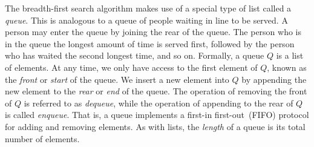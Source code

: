 The breadth-first search algorithm makes
use of a special type of list called a \emph{queue}. This
is analogous to a queue of people waiting in line to be served. A
person may enter the queue by joining the rear of the queue. The
person who is in the queue the longest amount of time is served first,
followed by the person who has waited the second longest time, and so
on. Formally, a queue $Q$ is a list of elements. At any
time, we only have access to the first element of $Q$, known as the
\emph{front} or \emph{start} of
the queue. We insert a new element into $Q$ by appending the new
element to the \emph{rear} or
\emph{end} of the queue. The operation of removing
the front of $Q$ is referred to as \emph{dequeue},
while the operation of appending to the rear of $Q$ is called
\emph{enqueue}. That is, a queue implements a first-in
first-out~(FIFO) protocol for
adding and removing elements. As with lists, the
\emph{length} of a queue is its total number of
elements.


